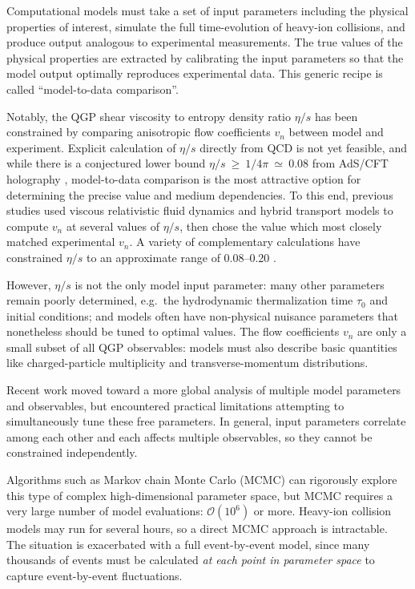 \documentclass[aps,prc,reprint,superscriptaddress,amsmath]{revtex4-1}
\newcommand{\order}[1]{$\mathcal O(10^{#1})$}
\begin{document}
Computational models must take a set of input parameters including the physical properties of interest, simulate the full time-evolution of heavy-ion collisions, and produce output analogous to experimental measurements.
The true values of the physical properties are extracted by calibrating the input parameters so that the model output optimally reproduces experimental data.
This generic recipe is called ``model-to-data comparison''.

Notably, the QGP shear viscosity to entropy density ratio $\eta/s$ has been constrained by comparing anisotropic flow coefficients $v_n$ between model and experiment.
Explicit calculation of $\eta/s$ directly from QCD is not yet feasible, and while there is a conjectured lower bound $\eta/s~\geq~1/4\pi~\simeq~0.08$ from AdS/CFT holography \cite{Kovtun:2004de}, model-to-data comparison is the most attractive option for determining the precise value and medium dependencies.
To this end, previous studies used viscous relativistic fluid dynamics and hybrid transport models to compute $v_n$ at several values of $\eta/s$, then chose the value which most closely matched experimental $v_n$.
A variety of complementary calculations have constrained $\eta/s$ to an approximate range of 0.08--0.20 \cite{Luzum:2008cw,Song:2010mg,Schenke:2010rr,Luzum:2012wu}.

However, $\eta/s$ is not the only model input parameter:
many other parameters remain poorly determined, e.g.~the hydrodynamic thermalization time $\tau_0$ and initial conditions; and models often have non-physical nuisance parameters that nonetheless should be tuned to optimal values.
The flow coefficients $v_n$ are only a small subset of all QGP observables:
models must also describe basic quantities like charged-particle multiplicity and transverse-momentum distributions.

Recent work \cite{Soltz:2012rk} moved toward a more global analysis of multiple model parameters and observables, but encountered practical limitations attempting to simultaneously tune these free parameters.
In general, input parameters correlate among each other and each affects multiple observables, so they cannot be constrained independently.

Algorithms such as Markov chain Monte Carlo (MCMC) can rigorously explore this type of complex high-dimensional parameter space, but MCMC requires a very large number of model evaluations: \order 6 or more.
Heavy-ion collision models may run for several hours, so a direct MCMC approach is intractable.
The situation is exacerbated with a full event-by-event model, since many thousands of events must be calculated \emph{at each point in parameter space} to capture event-by-event fluctuations.
\end{document}
